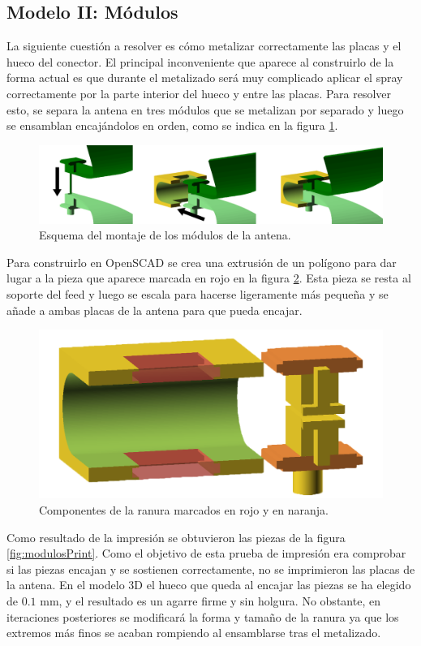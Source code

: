 \documentclass[11pt,a4paper,twoside,pdf]{article}
\numberwithin{equation}{section}
\begin{document}
\subsection{Modelo II: Módulos}

La siguiente cuestión a resolver es cómo metalizar correctamente las placas y el hueco del conector. El principal inconveniente que aparece al construirlo de la forma actual es que durante el metalizado será muy complicado aplicar el spray correctamente por la parte interior del hueco y entre las placas. Para resolver esto, se separa la antena en tres módulos que se metalizan por separado y luego se ensamblan encajándolos en orden, como se indica en la figura \ref{fig:modulos}.
\begin{figure}[!h]
    \centering
    \includegraphics[width=\linewidth]{img/modelos/2025_02_25-Ranuras/cunias.png}
    \caption{Esquema del montaje de los módulos de la antena.}
    \label{fig:modulos}
\end{figure}

Para construirlo en OpenSCAD se crea una extrusión de un polígono para dar lugar a la pieza que aparece marcada en rojo en la figura \ref{fig:molde}. Esta pieza se resta al soporte del feed y luego se escala para hacerse ligeramente más pequeña y se añade a ambas placas de la antena para que pueda encajar.
\begin{figure}[!h]
    \centering
    \includegraphics[width=0.7\linewidth]{img/modelos/2025_02_25-Ranuras/molde.png}
    \caption{Componentes de la ranura marcados en rojo y en naranja.}
    \label{fig:molde}
\end{figure}

Como resultado de la impresión se obtuvieron las piezas de la figura \ref{fig:modulosPrint}. Como el objetivo de esta prueba de impresión era comprobar si las piezas encajan y se sostienen correctamente, no se imprimieron las placas de la antena. En el modelo 3D el hueco que queda al encajar las piezas se ha elegido de $0.1$ mm, y el resultado es un agarre firme y sin holgura. No obstante, en iteraciones posteriores se modificará la forma y tamaño de la ranura ya que los extremos más finos se acaban rompiendo al ensamblarse tras el metalizado.
\end{document}
